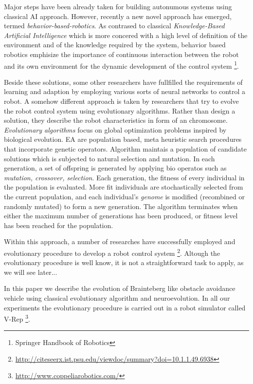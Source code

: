 \documentclass[format=acmsmall, review=false, screen=true]{acmart}
\begin{document}
Major steps have been already taken for building autonumous systems using classical AI approach. However, recently a new novel approach has emerged, termed \emph{behavior-based-robotics}. As contrased to classical \emph{Knowledge-Based Artificial Intelligence} which is more concered with a high level of definition of the environment and of the knowledge required by the system, behavior based robotics emphisize the importance of continuous interaction between the robot and its own environment for the dynamic development of the control system \footnote{Springer Handbook of Robotics}.

Beside these solutions, some other researchers have fullfilled the requirements of learning and adaption by employing various sorts of neural networks to control a robot. A somehow different approach is taken by researchers that try to evolve the robot control system using evolutionary algorithms. Rather than design a solution, they describe the robot characteristics in form of an chromosome. \emph{Evolutionary algorithms} focus on global optimization problems inspired by biological evolution. EA are population based, meta heuristic search procedures that incorporate genetic operators. Algorithm maintais a population of candidate solutions which is subjected to natural selection and mutation. In each generation, a set of offspring is generated by applying bio operatos such as \emph{mutation, crossover, selection}. Each generation, the fitness of every individual in the population is evaluated. More fit individuals are stochastically selected from the current population, and each individual's \emph{genome} is modified (recombined or randomly mutated) to form a new generation. The algorithm terminates when either the maximum number of generations has been produced, or fitness level has been reached for the population.

Within this approach, a number of researches have successfully employed and evolutionary procedure to develop a robot control system \footnote{\url{http://citeseerx.ist.psu.edu/viewdoc/summary?doi=10.1.1.49.6938}}. Altough the evolutionary procedure is well know, it is not a straightforward task to apply, as we will see later...


In this paper we describe the evolution of Brainteberg like obstacle avoidance vehicle using classical evolutionary algorithm and neuroevolution. In all our experiments the evolutionary procedure is carried out in a robot simulator called V-Rep \footnote{\url{http://www.coppeliarobotics.com/}}.
\end{document}
